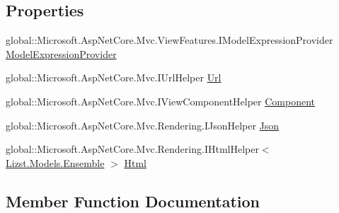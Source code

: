 \subsection*{Properties}
\begin{DoxyCompactItemize}
\item 
global\+::\+Microsoft.\+Asp\+Net\+Core.\+Mvc.\+View\+Features.\+I\+Model\+Expression\+Provider \mbox{\hyperlink{class_asp_net_core_1_1_views___ensemble___add_ensemble_a65dffbe5f658b69b8696ade9fa915e63}{Model\+Expression\+Provider}}
\item 
global\+::\+Microsoft.\+Asp\+Net\+Core.\+Mvc.\+I\+Url\+Helper \mbox{\hyperlink{class_asp_net_core_1_1_views___ensemble___add_ensemble_ac908afa73324526a31041d803456fe97}{Url}}
\item 
global\+::\+Microsoft.\+Asp\+Net\+Core.\+Mvc.\+I\+View\+Component\+Helper \mbox{\hyperlink{class_asp_net_core_1_1_views___ensemble___add_ensemble_aa5e3d231a827a6c0b1a16304d8ccd4c7}{Component}}
\item 
global\+::\+Microsoft.\+Asp\+Net\+Core.\+Mvc.\+Rendering.\+I\+Json\+Helper \mbox{\hyperlink{class_asp_net_core_1_1_views___ensemble___add_ensemble_aa8678281bd45d6360103414e5eab103f}{Json}}
\item 
global\+::\+Microsoft.\+Asp\+Net\+Core.\+Mvc.\+Rendering.\+I\+Html\+Helper$<$ \mbox{\hyperlink{class_lizst_1_1_models_1_1_ensemble}{Lizst.\+Models.\+Ensemble}} $>$ \mbox{\hyperlink{class_asp_net_core_1_1_views___ensemble___add_ensemble_ab93ba1042a30cf14c45b1e536ee007cc}{Html}}
\end{DoxyCompactItemize}


\subsection{Member Function Documentation}
\mbox{\label{class_asp_net_core_1_1_views___ensemble___add_ensemble_a7d9fa1316742288d873e76867d34f9ab}} 
